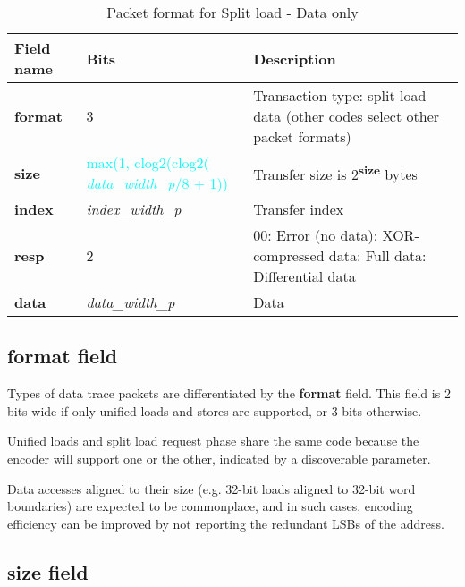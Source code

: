 \begin{table}[htp]
  \centering
  \caption{Packet format for Split load - Data only}
  \label{tab:te_datadx0y4}
  \begin{tabulary}{\textwidth}{|l|p{38mm}|p{92mm}|}
    \hline
    {\bf Field name} & {\bf Bits} & {\bf Description} \\
    \hline
    \textbf{format} & 	3	& Transaction type: split load data\newline	
		(other codes select other packet formats)\\
    \hline
    \textbf{size} & \textcolor{cyan}{max(1, clog2(clog2( \textit{data\_width\_p}/8 + 1))} & Transfer size is 2\textsuperscript{\textbf{size}} bytes \\
    \hline
    \textbf{index} & \textit{index\_width\_p} & Transfer index\\
    \hline
    \textbf{resp} & 	2	& 
		00: Error (no data): XOR-compressed data: Full data: Differential data\\
    \hline
    \textbf{data} & \textit{data\_width\_p} & 
                Data\\
    \hline
  \end{tabulary}
\end{table}

\subsection{format field} \label{sec:loadstore-format}

Types of data trace packets are differentiated by the \textbf{format} field.  This field is 2 bits wide if
only unified loads and stores are supported, or 3 bits otherwise.

Unified loads and split load request phase share the same code because the encoder will support one or the 
other, indicated by a discoverable parameter.

Data accesses aligned to their size (e.g. 32-bit loads aligned to 32-bit word boundaries) are expected to
be commonplace, and in such cases, encoding efficiency can be improved by not reporting the redundant LSBs of the address.

\subsection{size field} \label{sec:loadstore-size}


